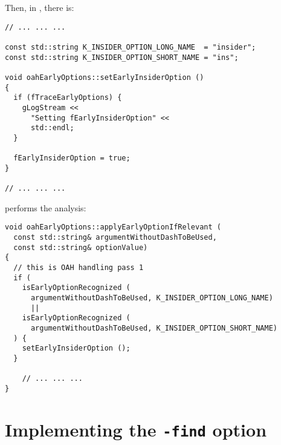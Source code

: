 Then, in , there is:
\begin{lstlisting}[language=Terminal]
// ... ... ...

const std::string K_INSIDER_OPTION_LONG_NAME  = "insider";
const std::string K_INSIDER_OPTION_SHORT_NAME = "ins";

void oahEarlyOptions::setEarlyInsiderOption ()
{
  if (fTraceEarlyOptions) {
    gLogStream <<
      "Setting fEarlyInsiderOption" <<
      std::endl;
  }

  fEarlyInsiderOption = true;
}

// ... ... ...
\end{lstlisting}

 performs the analysis:
\begin{lstlisting}[language=CPlusPlus]
void oahEarlyOptions::applyEarlyOptionIfRelevant (
  const std::string& argumentWithoutDashToBeUsed,
  const std::string& optionValue)
{
  // this is OAH handling pass 1
  if (
    isEarlyOptionRecognized (
      argumentWithoutDashToBeUsed, K_INSIDER_OPTION_LONG_NAME)
      ||
    isEarlyOptionRecognized (
      argumentWithoutDashToBeUsed, K_INSIDER_OPTION_SHORT_NAME)
  ) {
    setEarlyInsiderOption ();
  }

	// ... ... ...
}
\end{lstlisting}


\section{Implementing the {\tt -find} option}


